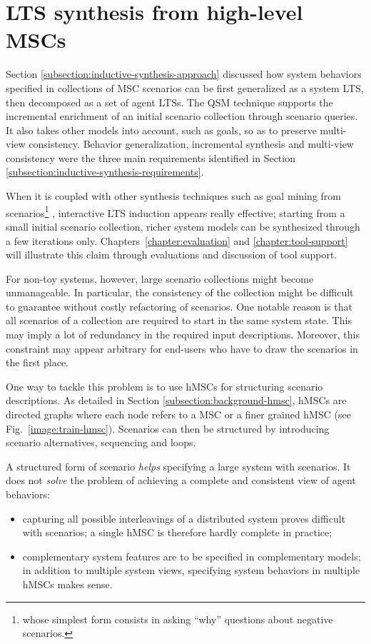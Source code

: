 \section{LTS synthesis from high-level MSCs\label{section:inductive-from-hMSC}}

Section \ref{subsection:inductive-synthesis-approach} discussed how system behaviors specified in collections of MSC scenarios can be first generalized as a system LTS, then decomposed as a set of agent LTSs. The QSM technique supports the incremental enrichment of an initial scenario collection through scenario queries. It also takes other models into account, such as goals, so as to preserve multi-view consistency. Behavior generalization, incremental synthesis and multi-view consistency were the three main requirements identified in Section \ref{subsection:inductive-synthesis-requirements}. 

When it is coupled with other synthesis techniques such as goal mining from scenarios\footnote{whose simplest form consists in asking ``why'' questions about negative scenarios.} \cite{Damas:2006}, interactive LTS induction appears really effective; starting from a small initial scenario collection, richer system models can be synthesized through a few iterations only. Chapters~\ref{chapter:evaluation} and \ref{chapter:tool-support} will illustrate this claim through evaluations and discussion of tool support.

For non-toy systems, however, large scenario collections might become unmanageable. In particular, the consistency of the collection might be difficult to guarantee without costly refactoring of scenarios. One notable reason is that all scenarios of a collection are required to start in the same system state. This may imply a lot of redundancy in the required input descriptions. Moreover, this constraint may appear arbitrary for end-users who have to draw the scenarios in the first place.

One way to tackle this problem is to use hMSCs for structuring scenario descriptions. As detailed in Section \ref{subsection:background-hmsc}, hMSCs are directed graphs where each node refers to a MSC or a finer grained hMSC (see Fig.~\ref{image:train-hmsc}). Scenarios can then be structured by introducing scenario alternatives, sequencing and loops.

A structured form of scenario \emph{helps} specifying a large system with scenarios. It does not \emph{solve} the problem of achieving a complete and consistent view of agent behaviors:
\begin{itemize}
\item capturing all possible interleavings of a distributed system proves difficult with scenarios; a single hMSC is therefore hardly complete in practice;
\item complementary system features are to be specified in complementary models; in addition to multiple system views, specifying system behaviors in multiple hMSCs makes sense.
\end{itemize}

